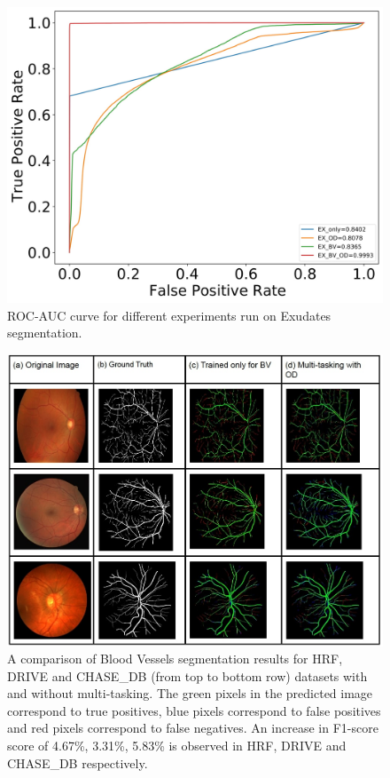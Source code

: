 \documentclass[utf8]{FrontiersinHarvard} %
\begin{document}
\begin{figure}
\begin{center}
\includegraphics[width=14cm]{images/roc_auc_exudates.jpg}%
\end{center}
\caption{ROC-AUC curve for different experiments run on Exudates segmentation. }
\label{fig:roc_auc_exudates}
\end{figure}

\begin{figure}
\begin{center}
\includegraphics[width=14cm]{images/bv_results.jpg}%
\end{center}
\caption{A comparison of Blood Vessels segmentation results for HRF, DRIVE and CHASE\_DB (from top to bottom row) datasets with and without multi-tasking. The green pixels in the predicted image correspond to true positives, blue pixels correspond to false positives and  red pixels correspond to false negatives. An increase in F1-score score of 4.67\%,  3.31\%, 5.83\% is observed in HRF, DRIVE and CHASE\_DB respectively.}
\label{fig:bv_segmentation_results}
\end{figure}
\end{document}
